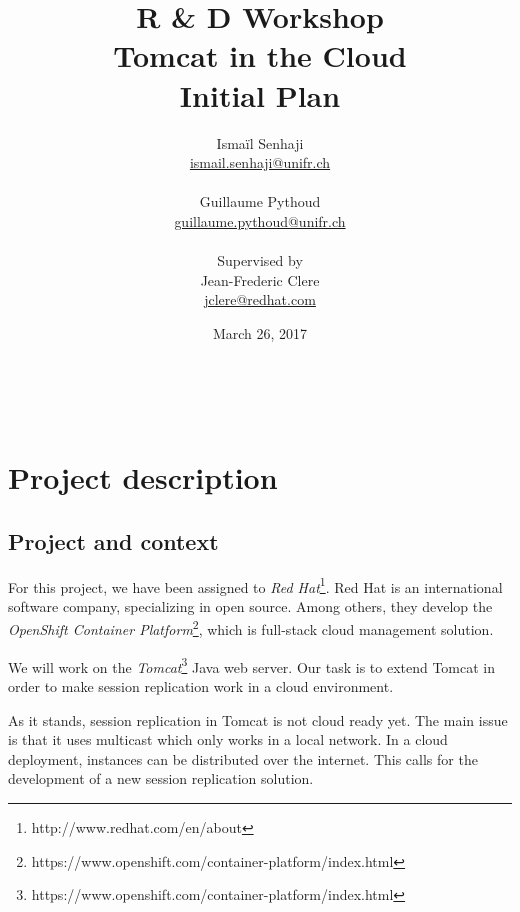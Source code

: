 \documentclass[11pt,a4paper]{article}
\title{%
    \textbf{R \& D Workshop} \\
    Tomcat in the Cloud
    \\
    \textbf{Initial Plan}
}
\author{%
    Ismaïl Senhaji \\
    \small \href{mailto:ismail.senhaji@unifr.ch}{ismail.senhaji@unifr.ch} \\
    \\
    Guillaume Pythoud \\
    \small \href{mailto:guillaume.pythoud@unifr.ch}{guillaume.pythoud@unifr.ch}
    \\
    \\
    Supervised by \\
    Jean-Frederic Clere \\
    \small \href{mailto:jclere@redhat.com}{jclere@redhat.com}
}
\date{March 26, 2017}
\begin{document}
\graphicspath{{fig/}}

\maketitle

\begin{figure}[b]
    \centering
    \\
\end{figure}

\newpage
\tableofcontents

\newpage


\section{Project description}

\subsection{Project and context}

For this project, we have been assigned to \emph{Red
    Hat}\footnote{http://www.redhat.com/en/about}. Red Hat is an international
software company, specializing in open source.  Among others, they develop
the \emph{OpenShift Container
    Platform}\footnote{https://www.openshift.com/container-platform/index.html},
which is full-stack cloud management solution.

We will work on the
\emph{Tomcat}\footnote{https://www.openshift.com/container-platform/index.html}
Java web server. Our task is to extend Tomcat in order to make session
replication work in a cloud environment.

As it stands, session replication in Tomcat is not cloud ready yet. The main
issue is that it uses multicast which only works in a local network. In a cloud
deployment, instances can be distributed over the internet. This calls for the
development of a new session replication solution.
\end{document}
